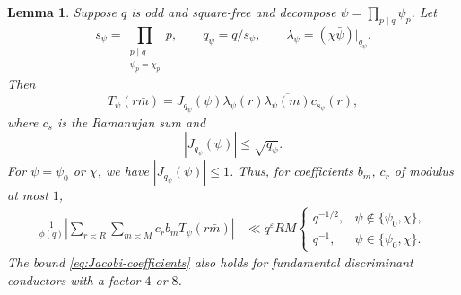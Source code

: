\documentclass[12pt, oneside]{amsart}
\newtheorem{lem}[prop]{Lemma}
\theoremstyle{definition}
\newcommand{\leqs}{\leqslant }
\newcommand{\eps}{\varepsilon}
\newcommand{\1}{\mathds{1}}
\begin{document}
\begin{lem}
\label{lem:Jacobi}
Suppose $q$ is odd and square-free and decompose
$\psi=\prod_{p\mid q}\psi_p$. Let
\begin{equation}
 s_\psi=\prod_{\substack{p\mid q\\\psi_p=\chi_p}}p,
 \qquad q_\psi=q/s_\psi,
 \qquad \lambda_\psi=(\chi\bar\psi)|_{q_\psi}.
 \label{eq:s-psi}
\end{equation}
Then
\begin{equation}
 T_\psi(r\bar m)=
 J_{q_\psi}(\psi)\lambda_\psi(r)
 \overline{\lambda_\psi(m)}c_{s_\psi}(r),
 \label{eq:Jacobi-exact}
\end{equation}
where $c_s$ is the Ramanujan sum and
\begin{equation}
 |J_{q_\psi}(\psi)|\leqs\sqrt{q_\psi}.
 \label{eq:Jacobi-bound}
\end{equation}
For $\psi=\psi_0$ or $\chi$, we have $|J_{q_\psi}(\psi)|\leqs 1$.  Thus, for coefficients $b_m$, $c_r$ of modulus at
most $1$,
\begin{equation}
\begin{aligned}
 \frac1{\phi(q)}
 \left|\sum_{r\asymp R}\sum_{m\asymp M}
 c_rb_mT_\psi(r\bar m)\right|
 &\ll q^\eps RM
 \begin{cases}
 q^{-1/2},&\psi\notin\{\psi_0,\chi\},\\
 q^{-1},&\psi\in\{\psi_0,\chi\}.
 \end{cases}
\end{aligned}
\label{eq:Jacobi-coefficients}
\end{equation}
The bound \eqref{eq:Jacobi-coefficients} also holds for fundamental discriminant conductors with a factor $4$ or $8$.
\end{lem}
\end{document}
